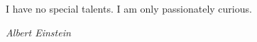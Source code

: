 \begin{shadequote}
I have no special talents. I am only passionately curious. \par\emph{Albert Einstein}
\end{shadequote}




